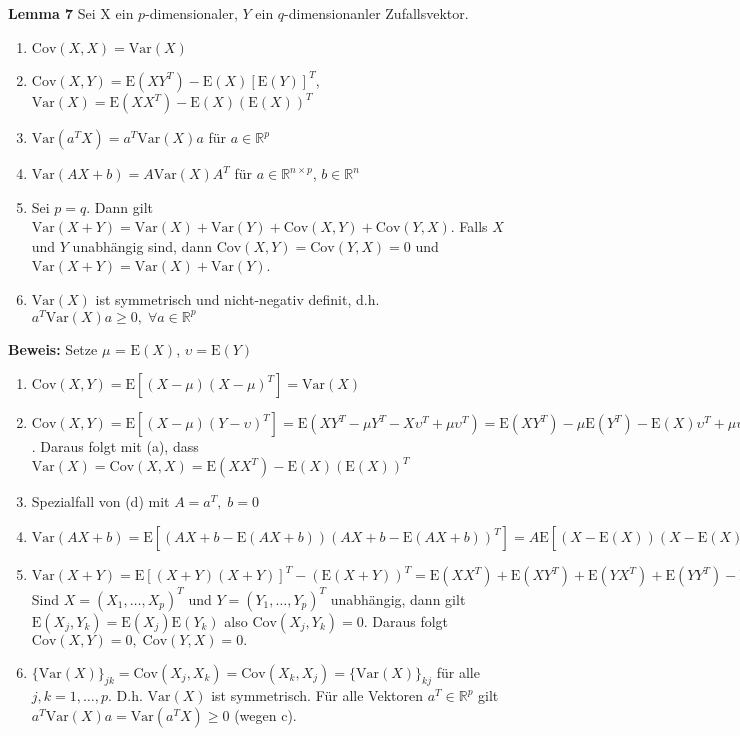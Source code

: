 \documentclass[12pt, a4paper]{article}
\newcommand{\E}{\mbox{I\negthinspace E}}
\theoremstyle{empty}
\newcommand{\R}{\mathbb{R}}
\newcommand{\A}{\mathcal{A}}
\newcommand{\1}{\mathds{1}}
\renewcommand{\E}{\mathrm{E}}
\newcommand{\Var}{\mathrm{Var}}
\newcommand{\Cov}{\mathrm{Cov}}
\begin{document}
\textbf{Lemma 7} Sei X ein $p$-dimensionaler, $Y$ ein $q$-dimensionanler Zufallsvektor.\\
\begin{enumerate}
\item $\Cov(X,X) = \Var(X)$\\
\item $\Cov(X,Y) = \E(XY^T) - \E(X)[\E(Y)]^T$, $\Var(X) = \E(XX^T)-\E(X)(\E(X))^T $\\
\item $\Var(a^T X) = a^T \Var(X) a$ für $a \in \R^p$
\item $\Var(AX + b) = A \Var(X) A^T$ für $a\in \R^{n\times p}$, $b \in \R^n$
\item Sei $p = q$. Dann gilt $\Var(X+Y) = \Var(X) + \Var(Y) + \Cov(X,Y) + \Cov(Y,X)$. Falls $X$ und $Y$ unabhängig sind, dann $\Cov(X,Y) = \Cov(Y,X) = 0$ und $\Var(X+Y) = \Var(X) + \Var(Y)$.
\item $\Var(X)$ ist symmetrisch und nicht-negativ definit, d.h. $a^T \Var(X)a \geq 0, \; \forall a\in \R^p$
\end{enumerate}

\textbf{Beweis:} Setze $\mu$ = $\E(X)$, $\upsilon = \E(Y)$
\begin{enumerate} %
\item $\Cov (X,Y) = \E[(X-\mu)(X-\mu)^T] = \Var(X)$
\item $\Cov(X,Y) = \E[(X-\mu)(Y-\upsilon)^T] = \E(XY^T - \mu Y^T - X\upsilon^T + \mu \upsilon^T) = \E(XY^T) - \mu \E(Y^T) - \E(X)\upsilon^T + \mu \upsilon^T = \E(XY^T - \E(X)(\E(Y))^T$. Daraus folgt mit (a), dass $\Var(X) = \Cov(X,X) = \E(XX^T) - \E(X)(\E(X))^T $
\item Spezialfall von (d) mit $A = a^T, \; b = 0$
\item $\Var(AX + b) = \E[(AX + b - \E(AX + b)) (AX + b - \E(AX + b))^T ] = A \E[(X-\E(X)) (X-\E(X))^T A^T ] = \A \Var(X) A^T $

\item $\Var(X + Y) = \E[(X + Y)(X+Y)]^T - (\E(X+Y))^T = \E(XX^T) + \E(XY^T) + \E(YX^T) + \E(YY^T) - \E(X)(\E(X))^T - \E(X)(\E(Y))^T - \E(Y)(\E(X))^T - \E(Y)(\E(Y))^T = \Var(X) + \Cov(X,Y) + \Cov(Y,X) + \Var(Y). $ Sind $X = (X_1, \ldots, X_p)^T$ und $Y = (Y_1, \ldots, Y_p)^T$ unabhängig, dann gilt $\E(X_j, Y_k) = \E(X_j)\E(Y_k)$ also $\Cov(X_j, Y_k) = 0$. Daraus folgt $\Cov(X,Y) = 0, \; \Cov(Y,X) = 0.$
\item $ \{ \Var(X) \}_{jk} = \Cov(X_j, X_k) = \Cov(X_k, X_j) = \{ \Var(X) \}_{kj}$ für alle $j,k = 1, \ldots, p$. D.h. $\Var(X)$ ist symmetrisch.
Für alle Vektoren $a^T \in \R^p$ gilt $a^T \Var(X)a = \Var(a^T X) \geq 0$ (wegen c).

\end{enumerate}
\end{document}
